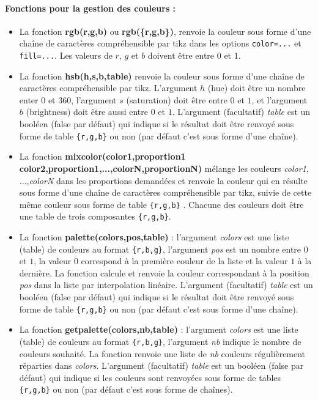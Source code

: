 \documentclass[%
10pt,%
a4paper,%
french,%
]%
{article}%
\begin{document}
\paragraph{Fonctions pour la gestion des couleurs :}
\begin{itemize}
    \item La fonction \textbf{rgb(r,g,b)} ou \textbf{rgb(\{r,g,b\})}, renvoie la couleur sous forme d'une chaîne de caractères compréhensible par tikz dans les options \verb|color=...| et \verb|fill=...|. Les valeurs de $r$, $g$ et $b$ doivent être entre $0$ et $1$.
    
    \item La fonction \textbf{hsb(h,s,b,table)} renvoie la couleur sous forme d'une chaîne de caractères compréhensible par tikz. L'argument $h$ (hue) doit être un nombre enter $0$ et $360$, l'argument $s$ (saturation) doit être entre $0$ et $1$, et l'argument $b$ (brightness) doit être aussi entre $0$ et $1$.
    L'argument (facultatif) \emph{table} est un booléen (false par défaut) qui indique si le résultat doit être renvoyé sous forme de table \verb|{r,g,b}| ou non (par défaut c'est sous forme d'une chaîne).
    
    \item La fonction \textbf{mixcolor(color1,proportion1 color2,proportion1,...,colorN,proportionN)} mélange les couleurs \emph{color1}, ...,\emph{colorN} dans les proportions demandées et renvoie la couleur qui en résulte sous forme d'une chaîne de caractères compréhensible par tikz, suivie de cette même couleur sous forme de table \verb|{r,g,b}| . Chacune des couleurs doit être une table de trois composantes \verb|{r,g,b}|.
    
    \item La fonction \textbf{palette(colors,pos,table)} : l'argument \emph{colors} est une liste (table) de couleurs au format \verb|{r,b,g}|, l'argument \emph{pos} est un nombre entre $0$ et $1$, la valeur $0$ correspond à la première couleur de la liste et la valeur $1$ à la dernière. La fonction calcule et renvoie la couleur correspondant à la position \emph{pos} dans la liste par interpolation linéaire. L'argument (facultatif) \emph{table} est un booléen (false par défaut) qui indique si le résultat doit être renvoyé sous forme de table \verb|{r,g,b}| ou non (par défaut c'est sous forme d'une chaîne).
    
    \item La fonction \textbf{getpalette(colors,nb,table)} : l'argument \emph{colors} est une liste (table) de couleurs au format \verb|{r,b,g}|, l'argument \emph{nb} indique le nombre de couleurs souhaité. La fonction renvoie une liste de \emph{nb} couleurs régulièrement réparties dans \emph{colors}. L'argument (facultatif) \emph{table} est un booléen (false par défaut) qui indique si les couleurs sont renvoyées sous forme de tables \verb|{r,g,b}| ou non (par défaut c'est sous forme de chaînes).  
    

\end{itemize}
\end{document}
